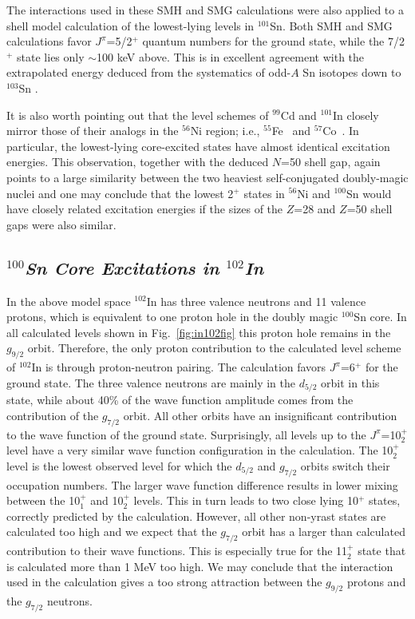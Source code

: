 \documentclass{article}
\begin{document}
The interactions used in these SMH and SMG calculations 
were also applied
to a shell model calculation of the lowest-lying levels in $^{101}$Sn.
Both SMH and SMG calculations favor $J^{\pi}$=5/2$^+$ quantum numbers
for the ground state, while 
the 7/2$^+$ state lies only $\sim$100 keV above. This is in excellent agreement 
with the extrapolated energy deduced from the systematics
of odd-$A$ Sn isotopes down to $^{103}$Sn \cite{sn103}.

It is also worth pointing out that the level schemes of $^{99}$Cd and $^{101}$In 
closely mirror those of their analogs  
in the $^{56}$Ni region; i.e., $^{55}$Fe~\cite{fe55} and 
$^{57}$Co~\cite{co57}.
In particular, the lowest-lying core-excited states have almost identical 
excitation energies.
This observation, together with the deduced $N$=50 shell gap,
again points to a large similarity between the two heaviest self-conjugated 
doubly-magic nuclei and one may conclude that
the lowest 2$^+$ states in $^{56}$Ni and $^{100}$Sn would have closely
related excitation energies if the sizes of the $Z$=28 and $Z$=50 shell
gaps were also similar.

\subsection{\it $^{100}$Sn Core Excitations in $^{102}$In}
In the above model space $^{102}$In has three valence neutrons and 11 
valence protons, which is equivalent to one proton hole in the 
doubly magic $^{100}$Sn core. In all calculated levels shown in
Fig.~\ref{fig:in102fig} this proton hole remains in the $g_{9/2}$ orbit. Therefore,
the only proton contribution to the calculated level scheme of 
$^{102}$In is through proton-neutron pairing. 
The calculation favors $J^{\pi}$=6$^+$ for 
the ground state. The three valence neutrons are mainly in the
$d_{5/2}$ orbit in this state, while about 40\% of the wave function 
amplitude comes from the contribution of the $g_{7/2}$ orbit. All
other orbits have an insignificant contribution to the wave function
of the ground state. Surprisingly, all levels up to the $J^\pi$=10$^+_2$
level have a very similar wave function configuration in the calculation.
The 10$^+_2$ level is the lowest observed level for which the 
$d_{5/2}$ and $g_{7/2}$ orbits switch their occupation numbers. 
The larger wave function difference results in lower mixing between 
the 10$^+_1$ and 10$^+_2$ levels. This in turn leads to two close
lying 10$^+$ states, correctly predicted by the calculation.
However, all other non-yrast states are calculated too high and
we expect that the $g_{7/2}$ orbit has a larger than calculated
contribution to their wave functions. This is especially true for
the 11$^+_2$ state that is calculated more than 1 MeV too high.
We may conclude that the interaction used in the calculation
gives a too strong attraction between the $g_{9/2}$ protons
and the $g_{7/2}$ neutrons. 
  
\end{document}

